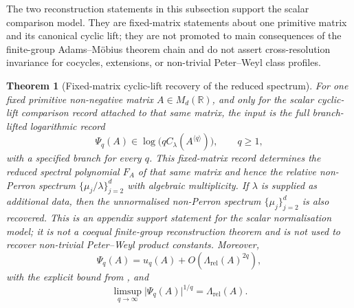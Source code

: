 \documentclass[11pt,a4paper]{amsart}
\theoremstyle{plain}
\newtheorem{theorem}{Theorem}[section]
\theoremstyle{definition}
\theoremstyle{remark}
\newcommand{\RR}{\mathbb{R}}
\newcommand{\abs}[1]{\lvert #1 \rvert}
\begin{document}
The two reconstruction statements in this subsection support the scalar
comparison model.  They are fixed-matrix
statements about one primitive matrix and its canonical cyclic lift; they are
not promoted to main consequences of the finite-group Adams--M\"obius
theorem chain and do not assert cross-resolution invariance for cocycles,
extensions, or non-trivial Peter--Weyl class profiles.

\begin{theorem}[Fixed-matrix cyclic-lift recovery of the reduced spectrum]
  \label{thm:finite-part-cyclic-lift-spectrum-identifiability}
  \label{thm:intro-cyclic-reconstruction}
  For one fixed primitive non-negative matrix \(A\in M_d(\RR)\), and only
  for the scalar cyclic-lift comparison record attached to that same matrix,
  the input is the full branch-lifted logarithmic record
  \[
    \Psi_q(A)\in \log\!\bigl(qC_\lambda(A^{\langle q\rangle})\bigr),
    \qquad q\ge1,
  \]
  with a specified branch for every \(q\). This fixed-matrix record
  determines the reduced spectral polynomial \(F_A\) of that same matrix and hence the
  relative non-Perron spectrum \(\{\mu_j/\lambda\}_{j=2}^d\) with
  algebraic multiplicity. If \(\lambda\) is supplied as additional data,
  then the unnormalised non-Perron spectrum \(\{\mu_j\}_{j=2}^d\) is also
  recovered.  This is an appendix support statement for the scalar
  normalisation model; it is not a coequal finite-group reconstruction theorem
  and is not used to recover non-trivial Peter--Weyl product constants.
  Moreover,
  \[
    \Psi_q(A)=u_q(A)+O\!\left(\Lambda_{\mathrm{rel}}(A)^{2q}\right),
  \]
  with the explicit bound from
  , and
  \[
    \limsup_{q\to\infty}\abs{\Psi_q(A)}^{1/q}
    =\Lambda_{\mathrm{rel}}(A).
  \]
\end{theorem}
\end{document}
